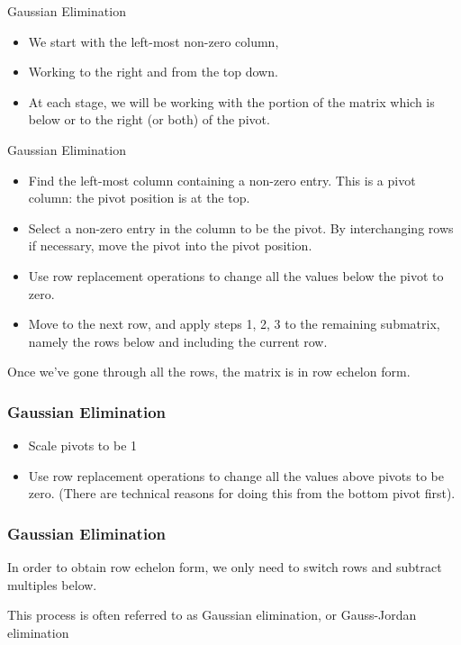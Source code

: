   \begin{frame}[fragile]{Gaussian Elimination}
\begin{itemize} 
\item We start with the left-most
non-zero column,
\item Working to the right and from the top down.  
\item At 
each stage, we will be working with the portion of the matrix which 
is below or to the right (or both) of the pivot.
\end{itemize}
\end{frame}

  \begin{frame}[fragile]{Gaussian Elimination}
\begin{itemize} 
\item Find the left-most column containing a non-zero entry.  This is 
a pivot column: the pivot position is at the top.   
\item Select a non-zero entry in the column to be the pivot. By 
interchanging rows if necessary, move the pivot into the pivot position.  
\item Use row replacement operations to change all the values below the pivot
to zero.  
\item Move to the next row, and apply steps 1, 2, 3 to the remaining
submatrix, namely the rows below and including the current row.
\end{itemize}

Once we've gone through all the rows, the matrix is in row echelon form.
\end{frame}


  \begin{frame}[fragile]\frametitle{Gaussian Elimination}

\begin{itemize}   
\item Scale pivots to be 1 
\item Use row replacement operations to change all the values above 
pivots to be zero.  (There are technical reasons for doing this from the 
bottom pivot first).
\end{itemize}
\end{frame}



  \begin{frame}[fragile]\frametitle{Gaussian Elimination}

In order to obtain row echelon form, we only need to switch rows and subtract 
multiples below.

This process is often referred to as Gaussian elimination, or 
Gauss-Jordan elimination

\end{frame}


